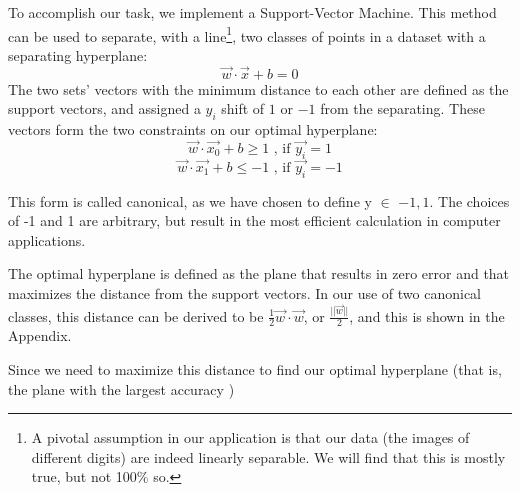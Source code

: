 %
%

To accomplish our task, we implement a Support-Vector Machine. This method can be used to separate, with a line\footnote{A pivotal assumption in our application is that our data (the images of different digits) are indeed linearly separable. We will find that this is mostly true, but not 100\% so.}, two classes of points in a dataset with a separating hyperplane:
\begin{equation}
\vec{w}\cdot\vec{x} + b = 0
\end{equation}
The two sets' vectors with the minimum distance to each other are defined as the support vectors, and assigned a $y_{i}$ shift of $1$ or $-1$ from the separating. These vectors form the two constraints on our optimal hyperplane:
\begin{equation}
\vec{w}\cdot\vec{x_0} + b \geq 1 \text{ , if } \vec{y_i} = 1
\end{equation}
\begin{equation}
\vec{w}\cdot\vec{x_1} + b \leq -1 \text{ , if } \vec{y_i} = -1
\end{equation}

This form is called canonical, as we have chosen to define y $\in$ ${-1, 1}$. The choices of -1 and 1 are arbitrary, but result in the most efficient calculation in computer applications.

The optimal hyperplane is defined as the plane that results in zero error and that maximizes the distance from the support vectors. In our use of two canonical classes, this distance can be derived to be $\frac{1}{2}\vec{w}\cdot\vec{w}$, or $\frac{||\vec{w}||}{2}$, and this is shown in the Appendix.

Since we need to maximize this distance to find our optimal hyperplane (that is, the plane with the largest accuracy )
